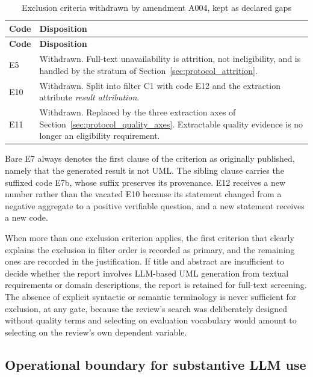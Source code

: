 \begin{longtable}{p{} p{}}
\caption{Exclusion criteria withdrawn by amendment A004, kept as declared gaps}
\label{tab:protocol_exclusion_withdrawn}\\
\toprule
\textbf{Code} & \textbf{Disposition} \\
\midrule
\endfirsthead
\toprule
\textbf{Code} & \textbf{Disposition} \\
\midrule
\endhead
E5 & Withdrawn. Full-text unavailability is attrition, not ineligibility, and is handled by the stratum of Section~\ref{sec:protocol_attrition}. \\
E10 & Withdrawn. Split into filter C1 with code E12 and the extraction attribute \textit{result attribution}. \\
E11 & Withdrawn. Replaced by the three extraction axes of Section~\ref{sec:protocol_quality_axes}. Extractable quality evidence is no longer an eligibility requirement. \\
\bottomrule
\end{longtable}

Bare E7 always denotes the first clause of the criterion as originally published, namely that the generated result is not UML. The sibling clause carries the suffixed code E7b, whose suffix preserves its provenance. E12 receives a new number rather than the vacated E10 because its statement changed from a negative aggregate to a positive verifiable question, and a new statement receives a new code.

When more than one exclusion criterion applies, the first criterion that clearly explains the exclusion in filter order is recorded as primary, and the remaining ones are recorded in the justification. If title and abstract are insufficient to decide whether the report involves LLM-based UML generation from textual requirements or domain descriptions, the report is retained for full-text screening. The absence of explicit syntactic or semantic terminology is never sufficient for exclusion, at any gate, because the review's search was deliberately designed without quality terms and selecting on evaluation vocabulary would amount to selecting on the review's own dependent variable.

\subsection{Operational boundary for substantive LLM use}
\label{sec:substantive_llm_use_boundary}


